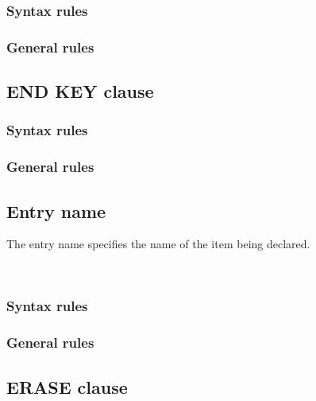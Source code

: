 \subsubsection{Syntax rules}

\subsubsection{General rules}

\subsection{END KEY clause}

\begin{syntax}[\deletedcolour]
\end{syntax}

\subsubsection{Syntax rules}

\subsubsection{General rules}

\subsection{Entry name}

The entry name specifies the name of the item being declared.

\begin{syntax}
  \begin{0-1}
     \\
    \identifier
  \end{0-1}
\end{syntax}

\subsubsection{Syntax rules}

\subsubsection{General rules}


\subsection{ERASE clause}

